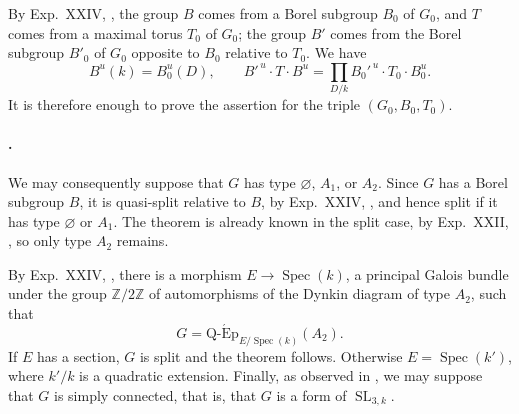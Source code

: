 By Exp.\ XXIV, , the group \(B\) comes from a Borel subgroup
\(B_0\) of \(G_0\), and \(T\) comes from a maximal torus \(T_0\) of
\(G_0\); the group \(B'\) comes from the Borel subgroup \(B'_0\) of
\(G_0\) opposite to \(B_0\) relative to \(T_0\).  We have
\[
 B^{u}(k)=B_0^u(D),\qquad
 B'^{\,u}\cdot T\cdot B^u
 =\prod_{D/k}B_0'^{\,u}\cdot T_0\cdot B_0^u.
\]
It is therefore enough to prove the assertion for the triple
\((G_0,B_0,T_0)\).

\paragraph{.}
We may consequently suppose that \(G\) has type
\(\varnothing\), \(A_1\), or \(A_2\).  Since \(G\) has a Borel
subgroup \(B\), it is quasi-split relative to \(B\), by Exp.\ XXIV,
, and hence split if it has type \(\varnothing\) or \(A_1\).
The theorem is already known in the split case, by Exp.\ XXII,
, so only type \(A_2\) remains.

By Exp.\ XXIV, , there is a morphism
\(E\to\operatorname{Spec}(k)\), a principal Galois bundle under the
group \(\mathbb Z/2\mathbb Z\) of automorphisms of the Dynkin diagram
of type \(A_2\), such that
\[
 G=\operatorname{Q\text{-}\acute{E}p}_{E/\operatorname{Spec}(k)}
 (A_2).
\]
If \(E\) has a section, \(G\) is split and the theorem follows.
Otherwise \(E=\operatorname{Spec}(k')\), where \(k'/k\) is a quadratic
extension.  Finally, as observed in , we may suppose that \(G\)
is simply connected, that is, that \(G\) is a form of
\(\operatorname{SL}_{3,k}\).

